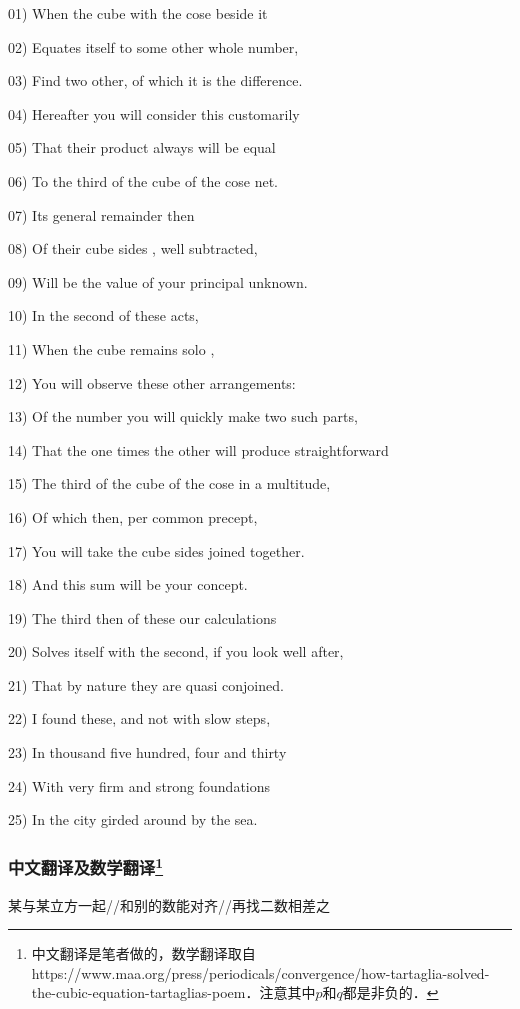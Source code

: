 01) When the cube with the cose beside it 

02) Equates itself to some other whole number,

03) Find two other, of which it is the difference. 

04) Hereafter you will consider this customarily

05) That their product always will be equal 

06) To the third of the cube of the cose net. 

07) Its general remainder then

08) Of their cube sides , well subtracted, 

09) Will be the value of your principal unknown.

10) In the second of these acts,

11) When the cube remains solo , 

12) You will observe these other arrangements:

13) Of the number you will quickly make two such parts,

14) That the one times the other will produce straightforward 

15) The third of the cube of the cose in a multitude, 

16) Of which then, per common precept,

17) You will take the cube sides joined together. 

18) And this sum will be your concept. 

19) The third then of these our calculations 

20) Solves itself with the second, if you look well after,

21) That by nature they are quasi conjoined.

22) I found these, and not with slow steps,

23) In thousand five hundred, four and thirty

24) With very firm and strong foundations

25) In the city girded around by the sea.


\subsubsection{中文翻译及数学翻译\footnote{中文翻译是笔者做的，数学翻译取自https://www.maa.org/press/periodicals/convergence/how-tartaglia-solved-the-cubic-equation-tartaglias-poem．注意其中$p$和$q$都是非负的．}}

某与某立方一起//和别的数能对齐//再找二数相差之

